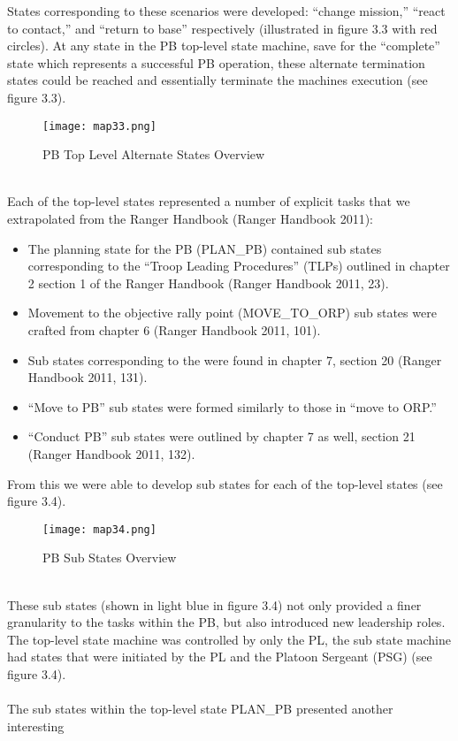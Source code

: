 States corresponding to these scenarios were developed: “change mission,”
“react to contact,” and “return to base” respectively (illustrated in figure
3.3 with red circles). At any state in the PB top-level state machine, save
for the “complete” state which represents a successful PB operation, these
alternate termination states could be reached and essentially terminate the
machines execution (see figure 3.3).\\
\begin{figure}[h]
  \centering
  \texttt{[image: map33.png]}
  \caption{PB Top Level Alternate States Overview}
\end{figure}\\
Each of the top-level states represented a number of explicit tasks that
we extrapolated from the Ranger Handbook (Ranger Handbook 2011):
\begin{itemize}
\item The planning state for the PB (PLAN_PB) contained sub states
  corresponding to the “Troop Leading Procedures” (TLPs) outlined in
  chapter 2 section 1 of the Ranger Handbook (Ranger Handbook 2011, 23).
\item Movement to the objective rally point (MOVE_TO_ORP) sub
  states were crafted from chapter 6 (Ranger Handbook 2011, 101).
\item Sub states corresponding to the were found in chapter 7,
  section 20 (Ranger Handbook 2011, 131).
\item “Move to PB” sub states were formed similarly to those in “move to ORP.”
\item “Conduct PB” sub states were outlined by chapter 7 as well, section 21
  (Ranger Handbook 2011, 132).
\end{itemize}
From this we were able to develop sub states for each of the top-level
states (see figure 3.4).\\
\begin{figure}[h]
  \centering
  \texttt{[image: map34.png]}
  \caption{PB Sub States Overview}
\end{figure}\\
These sub states (shown in light blue in figure 3.4) not only provided a
finer granularity to the tasks within the PB, but also introduced new leadership
roles. The top-level state machine was controlled by only the PL, the sub state
machine had states that were initiated by the PL and the Platoon Sergeant (PSG)
(see figure 3.4).\\ \\
The sub states within the top-level state PLAN_PB presented another interesting

